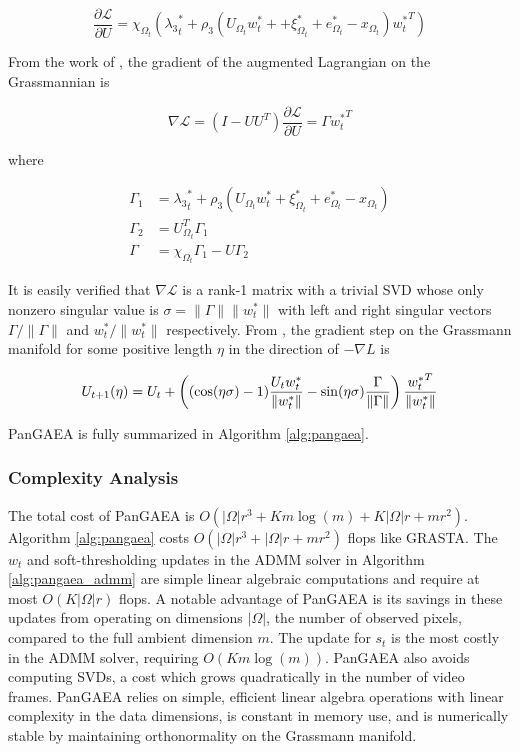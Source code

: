\documentclass[10pt,twocolumn,letterpaper]{article}
\begin{document}
\begin{equation}
	\frac{\partial \mathcal{L}}{\partial U} = \chi_{\Omega_t}({\lambda_3}_t^* + \rho_3(U_{\Omega_t} w_t^* + + \xi_{\Omega_t}^*+ e_{\Omega_t}^* - x_{\Omega_t}){w^*_t}^T)
\end{equation}

From the work of \cite{edelman}, the gradient of the augmented Lagrangian on the Grassmannian is

\begin{equation}
	 \nabla  \mathcal{L} = (I - UU^T)\frac{\partial \mathcal{L}}{\partial U} = \Gamma {w^*_t}^T
\end{equation}

where

\begin{equation}
\begin{split}
	\Gamma_1 &= {\lambda_3}_t^* + \rho_3(U_{\Omega_t} w_t^* + \xi_{\Omega_t}^* + e_{\Omega_t}^*  - x_{\Omega_t})\\
	\Gamma_2 &= U_{\Omega_t}^T \Gamma_1\\
	\Gamma &= \chi_{\Omega_t} \Gamma_1 - U\Gamma_2
\end{split}
\label{eq:gamma}
\end{equation}

It is easily verified that $\nabla \mathcal{L}$ is a rank-1 matrix with a trivial SVD whose only nonzero singular value is $\sigma = \|\Gamma\| \|w^*_t\|$ with left and right singular vectors  $\Gamma/\|\Gamma\|$ and ${w^*_t}/\|w^*_t\|$ respectively. From \cite{edelman}, the gradient step on the Grassmann manifold for some positive length $\eta$ in the direction of $-\nabla  L$ is

\begin{equation}
\small
	U_{t+1}(\eta) = U_t + \left ((\cos(\eta \sigma) - 1) \frac{U_tw_t^*}{\|w_t^*\|} - \sin(\eta \sigma) \frac{\Gamma}{\|\Gamma\|}\right )\frac{{w^*_t}^T}{\|w_t^*\|}
	\label{eq:subspace_update}
\end{equation}

PanGAEA is fully summarized in Algorithm \ref{alg:pangaea}.

\subsubsection{Complexity Analysis}

The total cost of PanGAEA is $O(|\Omega|r^3 + Km\log(m) + K|\Omega|r + mr^2)$. Algorithm \ref{alg:pangaea} costs $O(|\Omega |r^3 + |\Omega| r + mr^2)$ flops like GRASTA. The $w_t$ and soft-thresholding updates in the ADMM solver in Algorithm \ref{alg:pangaea_admm} are simple linear algebraic computations and require at most $O(K|\Omega|r)$ flops. A notable advantage of PanGAEA is its savings in these updates from operating on dimensions $|\Omega|$, the number of observed pixels, compared to the full ambient dimension $m$. The update for $s_t$ is the most costly in the ADMM solver, requiring $O(Km\log(m))$. PanGAEA also avoids computing SVDs, a cost which grows quadratically in the number of video frames. PanGAEA relies on simple, efficient linear algebra operations with linear complexity in the data dimensions, is constant in memory use, and is numerically stable by maintaining orthonormality on the Grassmann manifold. 
\end{document}
